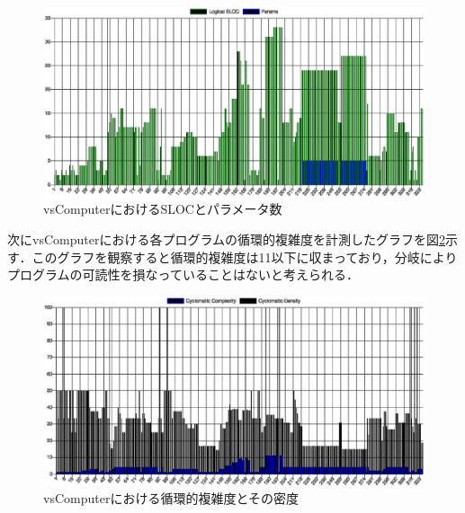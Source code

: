 \begin{itemize}
  \begin{figure}[!ht]
    \begin{center}
      \includegraphics[width=1.0\linewidth]{image/vsComputer_escomplex_SLOC_params.eps}
    \end{center}
      \vspace{-8mm} 
    \caption{vsComputerにおけるSLOCとパラメータ数}
    \label{vsComputer_sloc_and_params}
  \end{figure}

  次にvsComputerにおける各プログラムの循環的複雑度を計測したグラフを図\ref{vsComputer_cyclomatic_complexity}示す．このグラフを観察すると循環的複雑度は11以下に収まっており，分岐によりプログラムの可読性を損なっていることはないと考えられる．

  \begin{figure}[!ht]
    \begin{center}
      \includegraphics[width=1.0\linewidth]{image/vsComputer_escomplex_complexity.eps}
    \end{center}
      \vspace{-8mm} 
    \caption{vsComputerにおける循環的複雑度とその密度}
    \label{vsComputer_cyclomatic_complexity}
  \end{figure}


\end{itemize}
